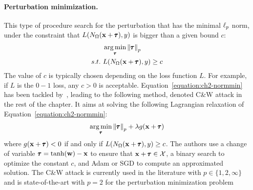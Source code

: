 \paragraph{Perturbation minimization.}
This type of procedure search for the perturbation that has the minimal $\ell_p $ norm, under the constraint that $L(N_\Omega(\mathbf{x} + \pmb{\tau}), y)$ is bigger than a given bound $c$:
\begin{align}
  &\operatorname*{arg\,min}_{\pmb{\tau}} \norm{\pmb{\tau}}_p \label{equation:ch2-normmin} \\
  s.t.\ &L(N_\Omega(\mathbf{x} + \pmb{\tau}), y) \geq c \notag
\end{align}
The value of $c$ is typically chosen depending on the loss function $L$. For example, if $L$ is the $0-1$ loss, any $c > 0$ is acceptable.
Equation~\ref{equation:ch2-normmin} has been tackled by~\citet{carlini2017towards}, leading to the following method, denoted C\&W attack in the rest of the chapter. It aims at solving the following Lagrangian relaxation of Equation~\ref{equation:ch2-normmin}:
\begin{equation}
  \operatorname*{arg\,min}_{\pmb{\tau}} \norm{\pmb{\tau}}_p + \lambda g(\mathbf{x}+\pmb{\tau})
\end{equation}
where $g(\mathbf{x} + \pmb{\tau})<0$ if and only if $L(N_\Omega(\mathbf{x} + \pmb{\tau}),y) \geq c$. 
The authors use a change of variable $\pmb{\tau} = \tanh(\mathbf{w}) - \mathbf{x}$ to ensure that $\mathbf{x} + \pmb{\tau} \in \mathcal{X}$, a binary search to optimize the constant $c$, and Adam or SGD to compute an approximated solution.
The C\&W attack is currently used in the literature with $p \in \{1, 2, \infty \}$ and is state-of-the-art with $p=2$ for the perturbation minimization problem






